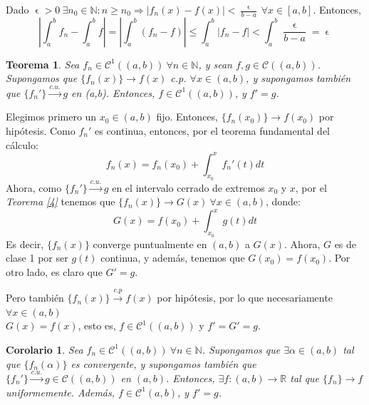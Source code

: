 \documentclass[11pt, a4paper]{article}
\makeatletter
\newif\IfInSansMode
\let\oldsf\sffamily
\renewcommand*{\sffamily}{\oldsf\mathversion{sans}\InSansModetrue}
\let\oldnorm\normalfont
\renewcommand*{\normalfont}{\oldnorm\InSansModefalse\mathversion{normal}}
\let\epsilon\upvarepsilon
\newcommand{\fn}{\{f_n\}}
\renewenvironment{proof}[1][\proofname] {\par\pushQED{\qed}\normalfont\topsep6\p@\@plus6\p@\relax\trivlist\item[\hskip\labelsep\itshape\sffamily#1\@addpunct{.}]\ignorespaces}{\popQED\endtrivlist\@endpefalse}
\theoremstyle{theorem-style}
\newtheorem{nth}{Teorema}[section]
\newtheorem{ncor}{Corolario}[section]
\theoremstyle{definition-style}
\theoremstyle{remark-style}
\theoremstyle{example-style}
\makeatother
\begin{document}
  \begin{proof} Dado $\displaystyle \epsilon >0\ \exists n_0 \in \mathbb{N}: n \ge n_0 \Rightarrow |f_n(x)-f(x)| < \frac{\epsilon}{b-a}\ \forall x \in [a,b]$. Entonces, $$\left| \int_a^b f_n - \int _a^b f \right| = \left| \int_a^b (f_n - f) \right| \le \int_a^b |f_n - f| < \int_a^b \frac{\epsilon}{b-a} = \epsilon$$
  \end{proof}

\begin{nth} \label{5}
  Sea $f_n\in \mathcal{C}^1((a,b)) \ \forall n \in \mathbb{N}$, y sean $f,g \in \mathcal{C}((a,b))$. Supongamos que $ \{f_n(x)\} \to f(x)$ c.p. $\forall x \in (a,b)$, y supongamos también que $\{f_n'\} \xrightarrow{c.u.} g $ en (a,b). Entonces, $f \in \mathcal{C}^1((a,b))$, y $f' = g$.
\end{nth}

  \begin{proof}
    Elegimos primero un $x_0 \in (a,b)$ fijo. Entonces, $\{f_n(x_0)\} \to f(x_0)$ por hipótesis.
    Como $f_n'$ es continua, entonces, por el teorema fundamental del cálculo:
    \[
      f_n(x) = f_n(x_0) + \int_{x_0}^x f_n'(t)dt
    \]
    Ahora, como  $\{f_n'\} \xrightarrow{c.u.} g $ en el intervalo cerrado de extremos $x_0$ y $x$, por el \textit{Teorema \ref{4}} tenemos que $\{f_n(x)\} \to G(x)\ \forall x \in (a,b)$, donde:
    \[
      G(x) = f(x_0) + \int_{x_0}^x g(t)dt
    \]
    Es decir, $\{f_n(x)\}$ converge puntualmente en $(a,b)$ a $G(x)$. Ahora, $G$ es de clase 1 por ser $g(t)$ continua, y además, tenemos que $G(x_0) = f(x_0)$.
    Por otro lado, es claro que $G' = g$.
    
    Pero también $\{f_n(x)\} \xrightarrow {c.p} f(x)$ por hipótesis, por lo que necesariamente $\forall x \in (a,b)$ \\ $G(x) = f(x)$, esto es, $f \in \mathcal{C}^1((a,b))$ y $f' = G' = g$.
  \end{proof}

\begin{ncor}
  Sea $f_n\in \mathcal{C}^1((a,b)) \ \forall n \in \mathbb{N}$. Supongamos que $\exists \alpha \in (a,b)$ tal que $ \{f_n(\alpha)\}$ es convergente, y supongamos también que $\{f_n'\} \xrightarrow{c.u.} g \in \mathcal C((a,b))$ en $(a,b)$. Entonces, $\exists f: (a,b) \to \mathbb{R}$ tal que $\fn \to f$ uniformemente. Además, $f \in \mathcal{C}^1(a,b)$, y  $f' = g$.
\end{ncor}
\end{document}
